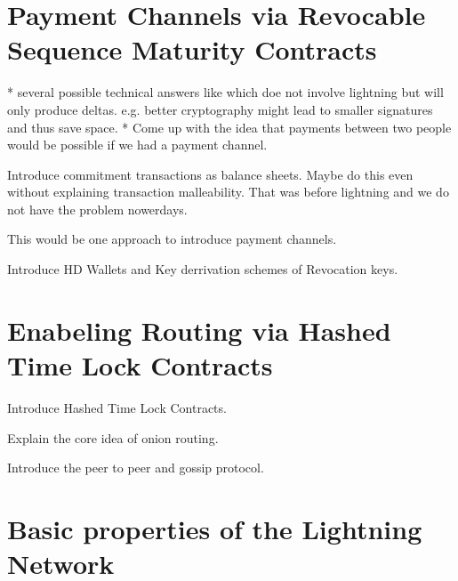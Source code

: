\documentclass[a4paper,12pt,oneside,openany]{book}
\begin{document}
\section{Payment Channels via Revocable Sequence Maturity Contracts}


* several possible technical answers like which doe not involve lightning but will only produce deltas. e.g. better cryptography might lead to smaller signatures and thus save space.
* Come up with the idea that payments between two people would be possible if we had a payment channel.


Introduce commitment transactions as balance sheets.
Maybe do this even without explaining transaction malleability. That was before lightning and we do not have the problem nowerdays.

This would be one approach to introduce payment channels.

Introduce HD Wallets and Key derrivation schemes of Revocation keys.

\section{Enabeling Routing via Hashed Time Lock Contracts}
Introduce Hashed Time Lock Contracts.

Explain the core idea of onion routing.

Introduce the peer to peer and gossip protocol.

\section{Basic properties of the Lightning Network}
\end{document}
